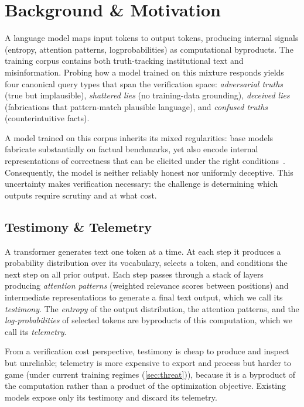 \section{Background \& Motivation}\label{sec:background}

A language model maps input tokens to output tokens, producing
internal signals (entropy, attention patterns, log\-probabilities)
as computational byproducts. The training corpus contains both
truth-tracking institutional text and misinformation.
Probing how a model trained on this mixture responds yields four canonical
query types that span the verification space: \emph{adversarial truths} (true
but implausible), \emph{shattered lies} (no training-data grounding),
\emph{deceived lies} (fabrications that pattern-match plausible language), and
\emph{confused truths} (counterintuitive facts).

A model trained on this corpus inherits its mixed regularities: base models
fabricate substantially on factual benchmarks, yet also encode internal
representations of correctness that can be elicited under the right
conditions~\cite{burns2023discovering}. Consequently, the model is neither reliably honest
nor uniformly deceptive.
This uncertainty makes verification necessary:
the challenge is determining which outputs require scrutiny and at what cost.

\subsection{Testimony \& Telemetry}

A transformer generates text one token at a time. At
each step it produces a probability distribution over its vocabulary, selects
a token, and conditions the next step on all prior output. Each step passes
through a stack of layers producing \emph{attention patterns} (weighted
relevance scores between positions) and intermediate representations
to generate a final text output, which we call its \emph{testimony}. The
\emph{entropy} of the output distribution, the attention patterns, and the
\emph{log-probabilities} of selected tokens are byproducts of this
computation, which we call its \emph{telemetry}.

From a verification cost perspective, testimony is cheap to produce and inspect but unreliable;
telemetry is more expensive to export and process but harder to game (under current training
regimes (\autoref{sec:threat})), because it is a byproduct of the computation rather
than a product of the optimization objective.
Existing models expose only its testimony and discard its telemetry.

